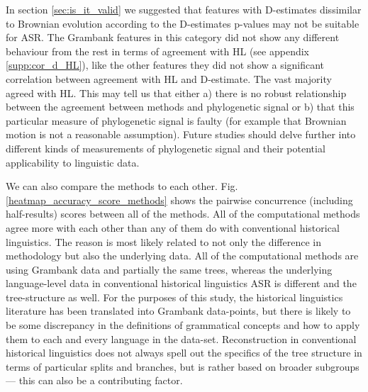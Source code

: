 \documentclass[12pt,letterpaper]{article}
\begin{document}
In section \ref{sec:is_it_valid} we suggested that features with D-estimates dissimilar to Brownian evolution according to the D-estimates p-values may not be suitable for ASR. The Grambank features in this category did not show any different behaviour from the rest in terms of agreement with HL (see appendix \ref{supp:cor_d_HL}), like the other features they did not show a significant correlation between agreement with HL and D-estimate. The vast majority agreed with HL. This may tell us that either a) there is no robust relationship between the agreement between methods and phylogenetic signal or b) that this particular measure of phylogenetic signal is faulty (for example that Brownian motion is not a reasonable assumption). Future studies should delve further into different kinds of measurements of phylogenetic signal and their potential applicability to linguistic data.

We can also compare the methods to each other. Fig. \ref{heatmap_accuracy_score_methods} shows the pairwise concurrence (including half-results) scores between all of the methods. All of the computational methods agree more with each other than any of them do with conventional historical linguistics. The reason is most likely related to not only the difference in methodology but also the underlying data. All of the computational methods are using Grambank data and partially the same trees, whereas the underlying language-level data in conventional historical linguistics ASR is different and the tree-structure as well. For the purposes of this study, the historical linguistics literature has been translated into Grambank data-points, but there is likely to be some discrepancy in the definitions of grammatical concepts and how to apply them to each and every language in the data-set. Reconstruction in conventional historical linguistics does not always spell out the specifics of the tree structure in terms of particular splits and branches, but is rather based on broader subgroups --- this can also be a contributing factor.

\end{document}
